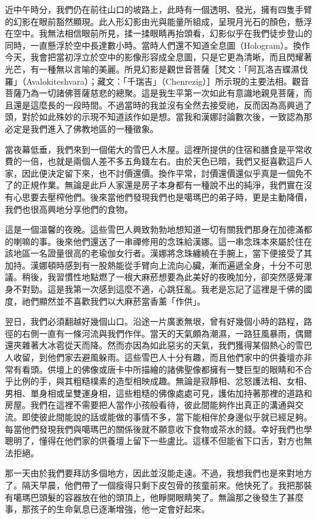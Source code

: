 近中午時分，我們仍在前往山口的坡路上，此時有一個透明、發光，擁有四隻手臂的幻影在眼前豁然顯現。此人形幻影由光與能量所組成，呈現月光石的顏色，懸浮在空中。我無法相信眼前所見，揉一揉眼睛再抬頭看，幻影似乎在我們徒步登山的同時，一直懸浮於空中長達數小時。當時人們還不知道全息圖（Hologram）。換作今天，我會把當初浮立於空中的影像形容成全息圖，只是它更為清晰，而且閃耀著光芒，有一種無以言喻的美麗。所見幻影是觀世音菩薩［梵文：「阿瓦洛吉蝶濕伐羅」（Avalokiteshvara）；藏文：「千瑞吉」（Chenrezig）］所示現的主要法相。觀音菩薩乃為一切諸佛菩薩慈悲的總聚。這是我生平第一次如此有意識地親見菩薩，而且還是這麼長的一段時間。不過當時的我並沒有全然去接受祂，反而因為高興過了頭，對於如此殊妙的示現不知道該作如是想。當我和漢娜討論數次後，一致認為那必定是我們進入了佛教地區的一種徵象。

當夜幕低垂，我們來到一個偌大的雪巴人木屋。這裡所提供的住宿和膳食是平常收費的一倍，也就是兩個人差不多五角錢左右。由於天色已暗，我們又挺喜歡這戶人家，因此便決定留下來，也不討價還價。換作平常，討價還價還似乎真是一個免不了的正規作業。無論是此戶人家還是房子本身都有一種說不出的純淨，我們實在沒有心思要去壓榨他們。後來當他們發現我們也是噶瑪巴的弟子時，更是主動降價，我們也很高興地分享他們的食物。

這是一個溫馨的夜晚。這些雪巴人興致勃勃地想知道一切有關我們那身在加德滿都的喇嘛的事。後來他們還送了一串禪修用的念珠給漢娜。這一串念珠本來屬於住在該地區一名證量很高的老瑜伽女行者。漢娜將念珠纏繞在手腕上，當下便接受了其加持。漢娜頓時感到有一股熱能從手臂向上流向心臟，漸而遍遞全身，十分不可思議。稍後，我習慣性地點燃了一根大麻菸想要為此美好的夜晚加分，卻突然感覺渾身不對勁。這是我第一次感到這麼不適，心跳狂亂。我老是忘記了這裡是千佛的國度，祂們顯然並不喜歡我們以大麻菸當香薰「作供」。

翌日，我們必須翻越好幾個山口。沿途一片廣袤無垠，曾有好幾個小時的路程，路徑的右側一直有一條河流與我們作伴。當天的天氣頗為潮濕，一路狂風暴雨，偶爾還夾雜著大冰雹從天而降。然而亦因為如此惡劣的天氣，我們獲得某個熱心的雪巴人收留，到他們家去避風躲雨。這些雪巴人十分有趣，而且他們家中的供養壇亦非常有看頭。供壇上的佛像或唐卡中所描繪的諸佛聖像都擁有一雙巨型的眼睛和不合乎比例的手，與其粗糙樸素的造型相映成趣。無論是寂靜相、忿怒護法相、女相、男相、單身相或呈雙運身相，這些粗糙的佛像處處可見，護佑加持著那裡的道路和房屋。我們在這裡不需要把人當作小孩般看待，彼此間能夠作出真正的溝通與交流。即使彼此間能說的話或能做的事情不多，當下能相伴於身邊似乎就已經足夠。每當他們發現我們與噶瑪巴的關係後就不願意收下食物或茶水的錢。幸好我們也學聰明了，懂得在他們家的供養壇上留下一些盧比。這樣不但能省下口舌，對方也無法拒絕。

那一天由於我們要拜訪多個地方，因此並沒能走遠。不過，我想我們也是來對地方了。隔天早晨，他們帶了一個瘦得只剩下皮包骨的孩童前來。他快死了。我把那裝有噶瑪巴頭髮的容器放在他的頭頂上，他睜開眼睛笑了。無論那之後發生了甚麼事，那孩子的生命氣息已逐漸增強，他一定會好起來。

